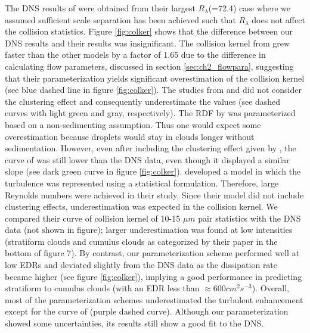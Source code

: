 The DNS results of \citet{Ayala2008a} were obtained from their largest $R_\lambda$(=72.4) case where we assumed sufficient scale separation has been achieved such that $R_\lambda$ does not affect the collision statistics. Figure \ref{fig:colker} shows that the difference between our DNS results and their results was insignificant. The collision kernel from \citet{Franklin2005} grew faster than the other models by a factor of 1.65 due to the difference in calculating flow parameters, discussed in section \ref{sec:ch2_flowpara}, suggesting that their parameterization yields significant overestimation of the collision kernel (see blue dashed line in figure \ref{fig:colker}). The studies from \citet{Wang1998b} and \citet{ Saffman1956} did not consider the clustering effect and consequently underestimate the values (see dashed curves with light green and gray, respectively). The RDF by \citet{Zhou2001} was parameterized based on a non-sedimenting assumption. Thus one would expect some overestimation \citep{Xue2008} because droplets would stay in clouds longer without sedimentation. However, even after including the clustering effect given by \citet{Zhou2001}, the curve of \citet{Wang1998b} was still lower than the DNS data, even though it displayed a similar slope (see dark green curve in figure \ref{fig:colker}). 
\citet{Pinsky2006collision} developed a model in which the turbulence was represented using a statistical formulation. Therefore, large Reynolds numbers were achieved in their study. Since their model did not include clustering effects, underestimation was expected in the collision kernel. We compared their curve of collision kernel of 10-15 $\mu m$ pair statistics with the DNS data (not shown in figure); larger underestimation was found at low intensities (stratiform clouds and cumulus clouds as categorized by their paper in the bottom of figure 7). By contrast, our parameterization scheme performed well at low EDRs and deviated slightly from the DNS data as the dissipation rate became higher (see figure \ref{fig:colker}), implying a good performance in predicting stratiform to cumulus clouds (with an EDR less than $\approx 600 cm^2s^{-3}$).  Overall, most of the parameterization schemes underestimated the turbulent enhancement except for the curve of \citet{Ayala2008b} (purple dashed curve). Although our parameterization showed some uncertainties, its results still show a good fit to the DNS.

